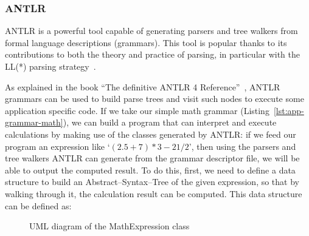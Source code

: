 \documentclass[]{usiinfbachelorproject}
\begin{document}
\subsubsection{ANTLR}\label{impl-parse-antlr}



ANTLR is a powerful tool capable of generating parsers and tree walkers from
formal language descriptions (grammars). This tool is popular thanks to its
contributions to both the theory and practice of parsing, in particular with
the LL\@(*) parsing strategy~\cite{antlrllstar}.

As explained in the book ``The definitive ANTLR 4
Reference''~\cite{definitiveantlr4reference}, ANTLR grammars can be
used to build parse trees and visit such nodes to execute some application
specific code.
If we take our simple math grammar (Listing~\ref{lst:app-grammar-math}), we
can build a program that can interpret and execute calculations by making use
of the classes generated by ANTLR\@: if we feed our program an expression like
`$ (2.5 + 7) * 3 - 21 / 2 $', then using the parsers and tree walkers ANTLR
can generate from the grammar descriptor file, we will be able to output the
computed result.
To do this, first, we need to define a data structure to build an
Abstract–Syntax–Tree of the given expression, so that by walking through it,
the calculation result can be computed. This data structure can be defined as:

\vspace{1em}

\begin{figure}[ht]
\centering
{}
\caption{UML diagram of the MathExpression class}
\end{figure}
\end{document}
